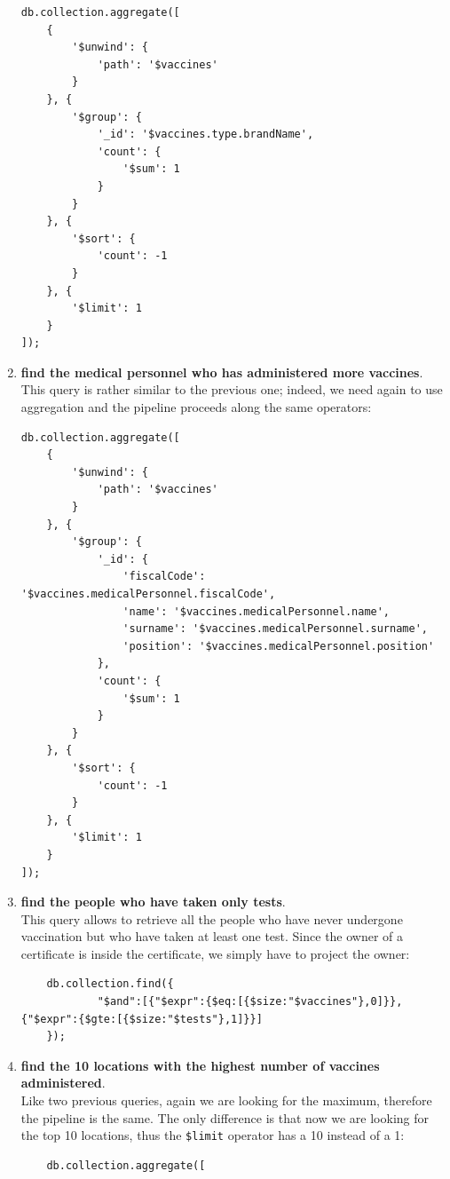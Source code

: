 \documentclass{article}
\begin{document}
\begin{enumerate}
    \begin{lstlisting}
db.collection.aggregate([
    {
        '$unwind': {
            'path': '$vaccines'
        }
    }, {
        '$group': {
            '_id': '$vaccines.type.brandName', 
            'count': {
                '$sum': 1
            }
        }
    }, {
        '$sort': {
            'count': -1
        }
    }, {
        '$limit': 1
    }
]);
    \end{lstlisting}
    \item \textbf{find the medical personnel who has administered more vaccines}.\\This query is rather similar to the previous one; indeed, we need again to use aggregation and the pipeline proceeds along the same operators:
    \begin{lstlisting}
db.collection.aggregate([
    {
        '$unwind': {
            'path': '$vaccines'
        }
    }, {
        '$group': {
            '_id': {
                'fiscalCode': '$vaccines.medicalPersonnel.fiscalCode', 
                'name': '$vaccines.medicalPersonnel.name', 
                'surname': '$vaccines.medicalPersonnel.surname', 
                'position': '$vaccines.medicalPersonnel.position'
            }, 
            'count': {
                '$sum': 1
            }
        }
    }, {
        '$sort': {
            'count': -1
        }
    }, {
        '$limit': 1
    }
]);
\end{lstlisting}
    \item \textbf{find the people who have taken only tests}.\\
    This query allows to retrieve all the people who have never undergone vaccination but who have taken at least one test. Since the owner of a certificate is inside the certificate, we simply have to project the owner: 
    \begin{lstlisting}
    db.collection.find({
            "$and":[{"$expr":{$eq:[{$size:"$vaccines"},0]}},{"$expr":{$gte:[{$size:"$tests"},1]}}]
    });
\end{lstlisting}
    \item \textbf{find the 10 locations with the highest number of vaccines administered}.\\
    Like two previous queries, again we are looking for the maximum, therefore the pipeline is the same. The only difference is that now we are looking for the top 10 locations, thus the \verb|$limit| operator has a 10 instead of a 1:
    \begin{lstlisting}
    db.collection.aggregate([

\end{lstlisting}
\end{enumerate}
\end{document}
